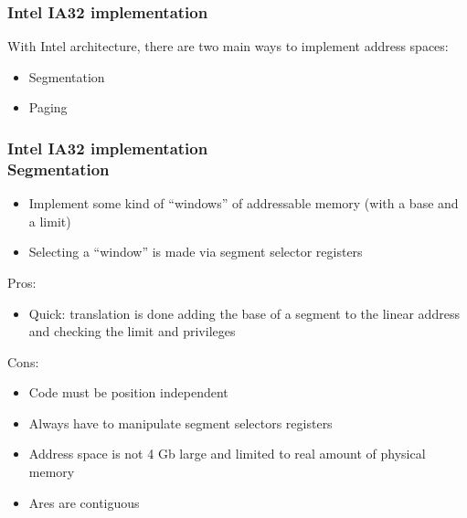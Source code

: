 
\begin{frame}
  \frametitle{Intel IA32 implementation}

  With Intel architecture, there are two main ways to implement address spaces:

  \nl

  \begin{itemize}
  \item Segmentation
  \item Paging
  \end{itemize}

\end{frame}


\begin{frame}
  \frametitle{Intel IA32 implementation\\Segmentation}

  \begin{itemize}[<+->]
  \item Implement some kind of ``windows'' of addressable memory (with a base and a limit)
  \item Selecting a ``window'' is made via segment selector registers
  \end{itemize}

  \nl

  Pros:

  \begin{itemize}[<+->]
  \item Quick: translation is done adding the base of a segment to the linear address and checking the limit and privileges
  \end{itemize}

  Cons:

  \begin{itemize}[<+->]
  \item Code must be position independent
  \item Always have to manipulate segment selectors registers
  \item Address space is not 4 Gb large and limited to real amount of physical memory
  \item Ares are contiguous
  \end{itemize}

\end{frame}


